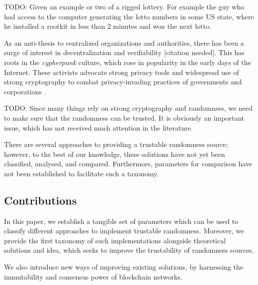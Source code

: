 TODO: Given an example or two of a rigged lottery. For example the guy who had access to the computer generating the lotto numbers in some US state, where he installed a rootkit in less than 2 minutes and won the next lotto.

As an anti-thesis to centralized organizations and authorities, there has been a surge of interest in decentralization and verifiability [citation needed]. This has roots in the \emph{cypherpunk} culture, which rose in popularity in the early days of the Internet. These activists advocate strong privacy tools and widespread use of strong cryptography to combat privacy-invading practices of governments and corporations .

TODO: Since many things rely on strong cryptography and randomness, we need to make sure that the randomness can be trusted. It is obviously an important issue, which has not received much attention in the literature.


There are several approaches to providing a trustable randomness source; however, to the best of our knowledge, these solutions have not yet been classified, analysed, and compared.
Furthermore, parameters for comparison have not been established to facilitate such a taxonomy.

\subsection*{Contributions}\label{subsec:contributions}
In this paper, we establish a tangible set of parameters which can be used to classify different approaches to implement trustable randomness.
Moreover, we provide the first taxonomy of such implementations alongside theoretical solutions and idea, which seeks to improve the trustability of randomness sources.

We also introduce new ways of improving existing solutions, by harnessing the immutability and consensus power of blockchain networks.


